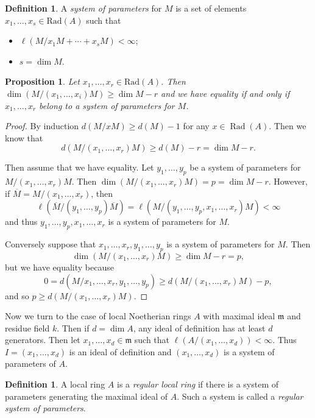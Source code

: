 \documentclass[leqno, openany]{memoir}
\newtheorem{prop}[thm]{Proposition}
\theoremstyle{definition}
\newtheorem{defn}[thm]{Definition}
\theoremstyle{remark}
\theoremstyle{plain}
\theoremstyle{definition}
\theoremstyle{remark}
\newcommand{\mf}[1]{\mathfrak{#1}}
\newcommand{\mr}[1]{\mathrm{#1}}
\newcommand{\ol}[1]{\overline{#1}}
\DeclareMathOperator{\Rad}{Rad}
\begin{document}
\begin{defn} A \textit{system of parameters} for $M$ is a set of elements $x_1,
\ldots, x_s \in \mr{Rad}(A)$ such that \begin{itemize} \item $\ell(M / x_1 M +
\cdots + x_s M) < \infty$; \item $s = \dim M$.  \end{itemize} \end{defn}

\begin{prop} Let $x_1, \ldots, x_r \in \mr{Rad}(A)$. Then $\dim (M / (x_1,
\ldots, x_i)M) \geq \dim M - r$ and we have equality if and only if $x_1,
\ldots, x_r$ belong to a system of parameters for $M$.  \end{prop}

\begin{proof} By induction $d(M / xM) \geq d(M) - 1$ for any $x \in \Rad (A)$.
    Then we know that \[ d(M / (x_1, \ldots, x_r)M) \geq d(M) - r = \dim M - r.
    \]

    Then assume that we have equality. Let $y_1, \ldots, y_p$ be a system of
    parameters for $M / (x_1, \ldots, x_r)M$. Then $\dim(M / (x_1, \ldots,
    x_r)M) = p = \dim M - r$. However, if $\ol{M} = M / (x_1, \ldots, x_r)$,
    then \[ \ell(\ol{M} / (y_1, \ldots, y_p) \ol{M}) = \ell(M / (y_1, \ldots,
    y_p, x_1, \ldots, x_r)M) < \infty \] and thus $y_1, \ldots, y_p, x_1,
    \ldots, x_r$ is a system of parameters for $M$.

    Conversely suppose that $x_1, \ldots, x_r, y_1, \ldots, y_p$ is a system of
    parameters for $M$. Then \[ \dim(M / (x_1, \ldots, x_r)M) \geq \dim M - r =
        p, \] but we have equality because \[ 0 = d(M / x_1, \ldots, x_r, y_1,
    \ldots, y_p) \geq d(M / (x_1, \ldots, x_r)M) - p, \] and so $p \geq d(M /
(x_1, \ldots, x_r)M)$.  \end{proof}

Now we turn to the case of local Noetherian rings $A$ with maximal ideal
$\mf{m}$ and residue field $k$. Then if $d = \dim A$, any ideal of definition
has at least $d$ generators. Then let $x_1, \ldots, x_d \in \mf{m}$ such that
$\ell(A / (x_1, \ldots, x_d)) < \infty$. Thus $I = (x_1, \ldots, x_d)$ is an
ideal of definition and $(x_1, \ldots, x_d)$ is a system of parameters of $A$.

\begin{defn} A local ring $A$ is a \textit{regular local ring} if there is a
system of parameters generating the maximal ideal of $A$. Such a system is
called a \textit{regular system of parameters}.  \end{defn}
\end{document}
